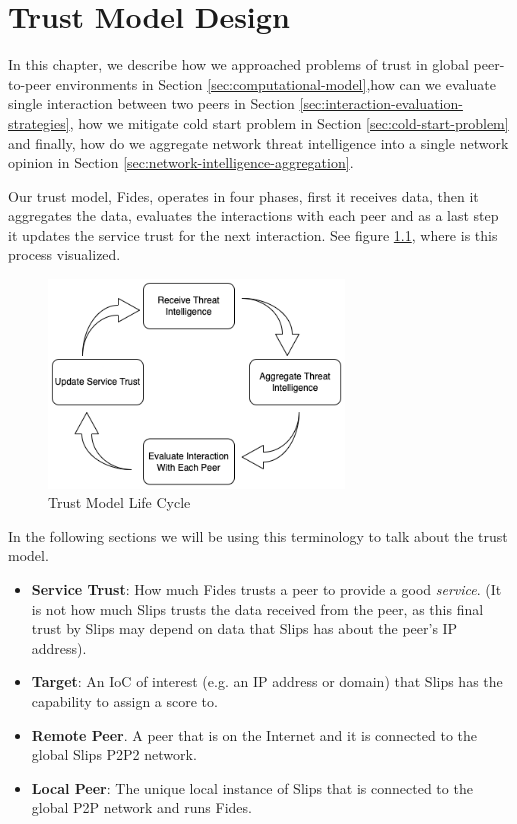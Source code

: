 \chapter{Trust Model Design}
\label{ch:trust-model-design}
In this chapter, we describe how we approached problems of trust in global peer-to-peer environments in Section \ref{sec:computational-model},how can we evaluate single interaction between two peers in Section \ref{sec:interaction-evaluation-strategies}, how we mitigate cold start problem in Section \ref{sec:cold-start-problem} and finally, how do we aggregate network threat intelligence into a single network opinion in Section \ref{sec:network-intelligence-aggregation}.

Our trust model, Fides, operates in four phases, first it receives data, then it aggregates the data, evaluates the interactions with each peer and as a last step it updates the service trust for the next interaction.
See figure \ref{fig:trust-model-life-cycle}, where is this process visualized.

\begin{figure}[ht!]
    \centering
    \includegraphics[width=0.7\textwidth]{assets/service_trust_diagram.png}
    \caption{Trust Model Life Cycle}
    \label{fig:trust-model-life-cycle}
\end{figure}

In the following sections we will be using this terminology to talk about the trust model.

\begin{itemize}
\item \textbf{Service Trust}: How much Fides trusts a peer to provide a good \textit{service}. (It is not how much Slips trusts the data received from the peer, as this final trust by Slips may depend on data  that Slips has about the peer's IP address).

\item \textbf{Target}: An IoC of interest (e.g. an IP address or domain) that Slips has the capability to assign a score to.

\item \textbf{Remote Peer}. A peer that is on the Internet and it is connected to the global Slips P2P2 network.

\item \textbf{Local Peer}: The unique local instance of Slips that is connected to the global P2P network and runs Fides.
\end{itemize}

